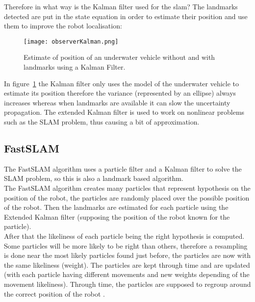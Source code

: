 Therefore in what way is the Kalman filter used for the slam? The landmarks detected are put in the state equation in order to estimate their position and use them to improve the robot localisation:

\begin{figure}[H]
\centering
    \texttt{[image: observerKalman.png]} 
    \caption{Estimate of position of an underwater vehicle without and with landmarks using a Kalman Filter.}
    \label{fig:obserKalman}
\end{figure}

In figure~\ref{fig:obserKalman} the Kalman filter only uses the model of the underwater vehicle to estimate its position therefore the variance (represented by an ellipse) always increases whereas when landmarks are available it can slow the uncertainty propagation. The extended Kalman filter is used to work on nonlinear problems such as the SLAM problem, thus causing a bit of approximation.

\subsection{FastSLAM}

The FastSLAM algorithm \cite{montemerlo2002fastslam} uses a particle filter and a Kalman filter to solve the SLAM problem, so this is also a landmark based algorithm.\\
The FastSLAM algorithm creates many particles that represent hypothesis on the position of the robot, the particles are randomly placed over the possible position of the robot. Then the landmarks are estimated for each particle using the Extended Kalman filter (supposing the position of the robot known for the particle).\\

After that the likeliness of each particle being the right hypothesis is computed. Some particles will be more likely to be right than others, therefore a resampling is done near the most likely particles found just before, the particles are now with the same likeliness (weight). The particles are kept through time and are updated (with each particle having different movements and new weights depending of the movement likeliness). Through time, the particles are supposed to regroup around the correct position of the robot \cite{sven13}.